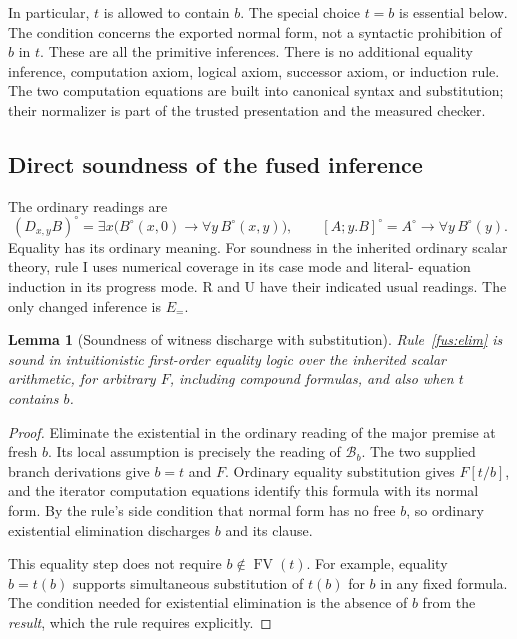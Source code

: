 \documentclass[11pt,letterpaper]{article}
\newtheorem{lemma}[theorem]{Lemma}
\theoremstyle{definition}\newtheorem{definition}[theorem]{Definition}
\theoremstyle{remark}\newtheorem{remark}[theorem]{Remark}
\begin{document}
In particular, $t$ is allowed to contain $b$. The special choice $t=b$ is
essential below. The condition concerns the exported normal form, not a
syntactic prohibition of $b$ in $t$. These are all the primitive inferences.
There is no additional equality inference, computation axiom, logical axiom,
successor axiom, or induction rule. The two computation equations are built
into canonical syntax and substitution; their normalizer is part of the
trusted presentation and the measured checker.

\subsection{Direct soundness of the fused inference}

The ordinary readings are
\[
 (D_{x,y}B)^\circ
 =\exists x\bigl(B^\circ(x,0)\to\forall y\,B^\circ(x,y)\bigr),
 \qquad
 [A;y.B]^\circ=A^\circ\to\forall y\,B^\circ(y).
\]
Equality has its ordinary meaning. For soundness in the inherited ordinary
scalar theory, rule I uses numerical coverage in its case mode and literal-
equation induction in its progress mode. R and U have their indicated usual
readings. The only changed inference is $E_{=}$.

\begin{lemma}[Soundness of witness discharge with substitution]
\label{fus:soundness}
Rule~\eqref{fus:elim} is sound in intuitionistic first-order equality logic
over the inherited scalar arithmetic, for arbitrary $F$, including compound
formulas, and also when $t$ contains $b$.
\end{lemma}
\begin{proof}
Eliminate the existential in the ordinary reading of the major premise at
fresh $b$. Its local assumption is precisely the reading of $\mathcal B_b$.
The two supplied branch derivations give $b=t$ and $F$. Ordinary equality
substitution gives $F[t/b]$, and the iterator computation equations identify
this formula with its normal form. By the rule's side condition that normal
form has no free $b$, so ordinary existential elimination discharges $b$ and
its clause.

This equality step does not require $b\notin\operatorname{FV}(t)$.
For example, equality $b=t(b)$ supports simultaneous substitution of $t(b)$
for $b$ in any fixed formula. The condition needed for existential elimination
is the absence of $b$ from the \emph{result}, which the rule requires explicitly.
\end{proof}
\end{document}
